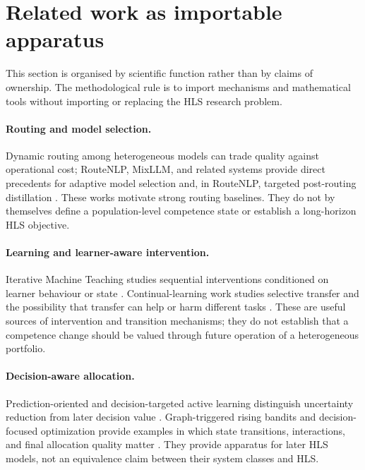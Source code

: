 \section{Related work as importable apparatus}

This section is organised by scientific function rather than by claims of ownership. The methodological rule is to import mechanisms and mathematical tools without importing or replacing the HLS research problem.

\paragraph{Routing and model selection.}
Dynamic routing among heterogeneous models can trade quality against operational cost; RouteNLP, MixLLM, and related systems provide direct precedents for adaptive model selection and, in RouteNLP, targeted post-routing distillation \citep{guo2026routenlp,wang2025mixllm}. These works motivate strong routing baselines. They do not by themselves define a population-level competence state or establish a long-horizon HLS objective.

\paragraph{Learning and learner-aware intervention.}
Iterative Machine Teaching studies sequential interventions conditioned on learner behaviour or state \citep{liu2017iterative,liu2018blackbox}. Continual-learning work studies selective transfer and the possibility that transfer can help or harm different tasks \citep{lee2021sharing}. These are useful sources of intervention and transition mechanisms; they do not establish that a competence change should be valued through future operation of a heterogeneous portfolio.

\paragraph{Decision-aware allocation.}
Prediction-oriented and decision-targeted active learning distinguish uncertainty reduction from later decision value \citep{bickfordsmith2023prediction,filstroff2024targeted}. Graph-triggered rising bandits and decision-focused optimization provide examples in which state transitions, interactions, and final allocation quality matter \citep{genalti2024graph,elmachtoub2021smart,wang2023scalable}. They provide apparatus for later HLS models, not an equivalence claim between their system classes and HLS.

